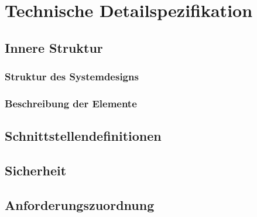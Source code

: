 \section{Technische Detailspezifikation}
\subsection{Innere Struktur}
\subsubsection{Struktur des Systemdesigns}
\subsubsection{Beschreibung der Elemente}
\subsection{Schnittstellendefinitionen}
\subsection{Sicherheit}
\subsection{Anforderungszuordnung}

